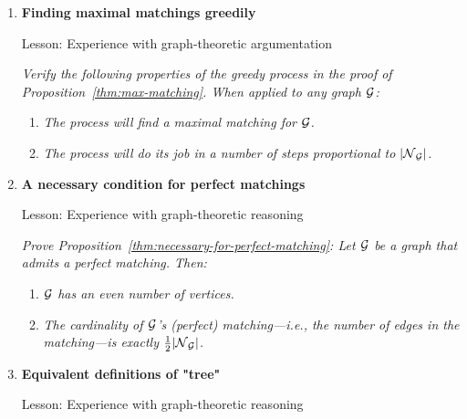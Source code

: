 \begin{enumerate}
{\sc Lesson:} Experience with graph-theoretic reasoning

\smallskip

We recall the graph $\g(\Phi)$ that we constructed in Section~\ref{sec:graph-model-2SAT} from a {\sf 2SAT}-formula $\Phi$.

\smallskip

{\em Prove Lemma~\ref{lem:2SATlemma1}:
If $\g(\Phi)$ contains a path from vertex $x$ to vertex $y$, then it contains a path from vertex $\bar{y}$ to vertex $\bar{x}$.}

\medskip\item
{\bf Finding maximal matchings greedily}

{\sc Lesson:} Experience with graph-theoretic argumentation

\smallskip


{\em Verify the following properties of the greedy process in the proof of Proposition~\ref{thm:max-matching}.  When applied to any graph $\mbox{$\cal G$}$:}
  \begin{enumerate}
  \item
{\em The process will find a maximal matching for $\mbox{$\cal G$}$.}
  \medskip\item
{\em The process will do its job in a number of steps proportional to $|\mbox{$\cal N$}_{\mbox{{\scriptsize $\cal G$}}}|$.}
  \end{enumerate}

\medskip\item
{\bf A necessary condition for perfect matchings}

{\sc Lesson:} Experience with graph-theoretic reasoning

\smallskip

{\em Prove Proposition~\ref{thm:necessary-for-perfect-matching}:
Let $\mbox{$\cal G$}$ be a graph that admits a perfect matching.  Then:}
  \begin{enumerate}
  \item
{\em $\mbox{$\cal G$}$ has an even number of vertices.}
  \medskip\item
{\em The cardinality of $\mbox{$\cal G$}$'s (perfect) matching---i.e., the number of edges in the matching---is exactly $\frac{1}{2}|\mbox{$\cal N$}_{\mbox{{\scriptsize $\cal G$}}}|$.}
  \end{enumerate}

\medskip\item
{\bf Equivalent definitions of "tree"}

{\sc Lesson:} Experience with graph-theoretic reasoning

\smallskip


\end{enumerate}
